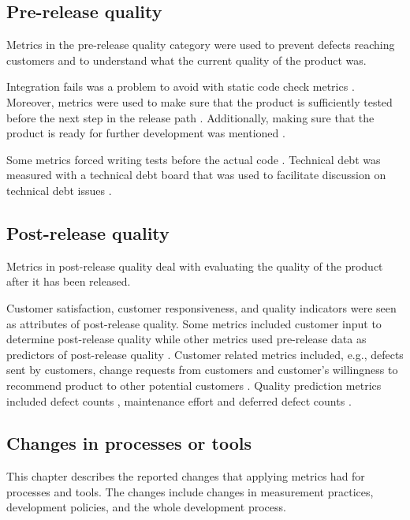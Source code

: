 \documentclass{sig-alternate}
\newcommand{\juha}[1]{\ignorespaces}
\begin{document}
\subsection{Pre-release quality}
\label{sec:PreQuality}
Metrics in the pre-release quality category were used to prevent defects
reaching customers and to understand what the current quality of the
product was.

Integration fails was a problem to avoid with static code check metrics
\cite{Janus20129}. Moreover, metrics were used to make sure that the product
is sufficiently tested before the next step in the release path
\cite{Janus20129}\cite{Dubinsky200512}. Additionally, making sure that the
product is ready for further development was mentioned \cite{Green2011}.


Some metrics forced writing tests before the actual code \cite{Trapa2006243}.
Technical debt was measured with a technical debt board that was used to
facilitate discussion on technical debt issues \cite{LNBIP01490121}.

\subsection{Post-release quality}
\label{sec:PostQuality}
Metrics in post-release quality deal with evaluating the quality of the
product after it has been released.

Customer satisfaction, customer responsiveness, and quality indicators were
seen as attributes of post-release quality. Some metrics included customer
input to determine post-release quality
\cite{Petersen2010654,Green2011,Cheng200929} while other metrics
used pre-release data as predictors of post-release quality
\cite{Staron20101069,Petersen2010654,Green2011}. Customer related
metrics included, e.g., defects sent by customers\cite{Cheng200929},
change requests from customers \cite{Petersen2010654} and customer's
willingness to recommend product to other potential customers
\cite{Green2011}.
Quality prediction metrics included defect counts \cite{Petersen2010654},
maintenance effort \cite{Staron20101069} and deferred defect counts
\cite{Green2011}.

\subsection{Changes in processes or tools}
\label{sec:ChangesInProcesses}
This chapter describes the reported changes that applying metrics had for processes and tools. The changes include changes in measurement practices, development policies, and the whole development process.
\end{document}
